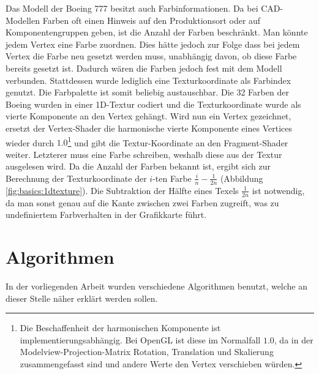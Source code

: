 Das Modell der Boeing 777 besitzt auch Farbinformationen. Da bei CAD-Modellen Farben oft einen Hinweis auf den Produktionsort oder auf Komponentengruppen geben, ist die Anzahl der Farben beschränkt. Man könnte jedem Vertex eine Farbe zuordnen. Dies hätte jedoch zur Folge dass bei jedem Vertex die Farbe neu gesetzt werden muss, unabhängig davon, ob diese Farbe bereits gesetzt ist. Dadurch wären die Farben jedoch fest mit dem Modell verbunden. Stattdessen wurde lediglich eine Texturkoordinate als Farbindex genutzt. Die Farbpalette ist somit beliebig austauschbar. Die 32 Farben der Boeing wurden in einer 1D-Textur codiert und die Texturkoordinate wurde als vierte Komponente an den Vertex gehängt. Wird nun ein Vertex gezeichnet, ersetzt der Vertex-Shader die harmonische vierte Komponente eines Vertices wieder durch $1.0$\footnote{Die Beschaffenheit der harmonischen Komponente ist implementierungsabhängig. Bei OpenGL ist diese im Normalfall $1.0$, da in der Modelview-Projection-Matrix Rotation, Translation und Skalierung zusammengefasst sind und andere Werte den Vertex verschieben würden.} und gibt die Textur-Koordinate an den Fragment-Shader weiter. Letzterer muss eine Farbe schreiben, weshalb diese aus der Textur ausgelesen wird. Da die Anzahl der Farben bekannt ist, ergibt sich zur Berechnung der Texturkoordinate der $i$-ten Farbe $\frac{i}{n}-\frac{1}{2n}$ (Abbildung \ref{fig:basics:1dtexture}). Die Subtraktion der Hälfte eines Texels $\frac{1}{2n}$ ist notwendig, da man sonst genau auf die Kante zwischen zwei Farben zugreift, was zu undefiniertem Farbverhalten in der Grafikkarte führt.

\section{Algorithmen}
\label{sec:basics:algos}
In der vorliegenden Arbeit wurden verschiedene Algorithmen benutzt, welche an dieser Stelle näher erklärt werden sollen.

